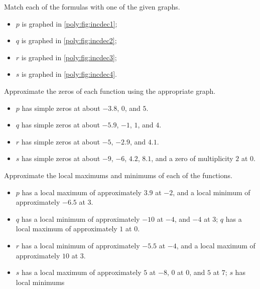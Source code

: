\begin{exercises}
\begin{problem}
 	\begin{subproblem}
 		Match each of the formulas with one of the given graphs.
 		\begin{shortsolution}
 			\begin{itemize}
 				\item $p$ is graphed in \vref{poly:fig:incdec1};
 				\item $q$ is graphed in \vref{poly:fig:incdec2};
 				\item $r$ is graphed in \vref{poly:fig:incdec3};
 				\item $s$ is graphed in \vref{poly:fig:incdec4}.
 			\end{itemize}
 		\end{shortsolution}
 	\end{subproblem}
 	\begin{subproblem}
 		Approximate the zeros of each function using the appropriate graph.
 		\begin{shortsolution}
 			\begin{itemize}
 				\item $p$ has simple zeros at about $-3.8$, $0$, and $5$.
 				\item $q$ has simple zeros at about $-5.9$, $-1$, $1$, and $4$.
 				\item $r$ has simple zeros at about $-5$, $-2.9$, and $4.1$.
 				\item $s$ has simple zeros at about $-9$, $-6$, $4.2$, $8.1$, and a zero of multiplicity $2$ at $0$.
 			\end{itemize}
 		\end{shortsolution}
 	\end{subproblem}
 	\begin{subproblem}
 		Approximate the local maximums and minimums of each of the functions.
 		\begin{shortsolution}
 			\begin{itemize}
 				\item $p$ has a local maximum of approximately $3.9$ at $-2$, and a local minimum of approximately $-6.5$ at $3$.
 				\item $q$ has a local minimum of approximately $-10$ at $-4$, and $-4$ at $3$; $q$ has a local maximum of approximately $1$ at $0$.
 				\item $r$ has a local minimum of approximately $-5.5$ at $-4$, and a local maximum of approximately $10$ at $3$.
 				\item $s$ has a local maximum of approximately $5$ at $-8$, $0$ at $0$, and $5$ at  $7$; $s$ has local minimums

\end{itemize}
\end{shortsolution}
\end{subproblem}
\end{problem}
\end{exercises}
